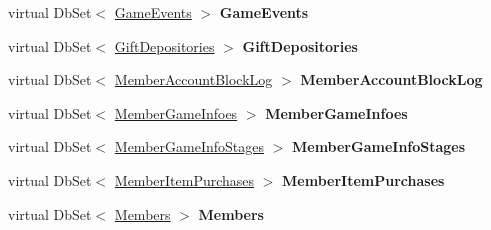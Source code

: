 \begin{DoxyCompactItemize}
\item 
virtual Db\+Set$<$ \hyperlink{a00083}{Game\+Events} $>$ {\bfseries Game\+Events}\hypertarget{a00065_a16fffa8f4637449b5e3f2db3afee1e06}{}\label{a00065_a16fffa8f4637449b5e3f2db3afee1e06}

\item 
virtual Db\+Set$<$ \hyperlink{a00086}{Gift\+Depositories} $>$ {\bfseries Gift\+Depositories}\hypertarget{a00065_aab20cb8f0bdfb846057cbcb1f18969f6}{}\label{a00065_aab20cb8f0bdfb846057cbcb1f18969f6}

\item 
virtual Db\+Set$<$ \hyperlink{a00135}{Member\+Account\+Block\+Log} $>$ {\bfseries Member\+Account\+Block\+Log}\hypertarget{a00065_ac4fe771e2a7b3c8b38b6f8995d996425}{}\label{a00065_ac4fe771e2a7b3c8b38b6f8995d996425}

\item 
virtual Db\+Set$<$ \hyperlink{a00137}{Member\+Game\+Infoes} $>$ {\bfseries Member\+Game\+Infoes}\hypertarget{a00065_a9d100a658fca7ffe660f1d8cc2f9b1fe}{}\label{a00065_a9d100a658fca7ffe660f1d8cc2f9b1fe}

\item 
virtual Db\+Set$<$ \hyperlink{a00139}{Member\+Game\+Info\+Stages} $>$ {\bfseries Member\+Game\+Info\+Stages}\hypertarget{a00065_a068e8c53f6de34b24adbe7b5fc7b8ee9}{}\label{a00065_a068e8c53f6de34b24adbe7b5fc7b8ee9}

\item 
virtual Db\+Set$<$ \hyperlink{a00141}{Member\+Item\+Purchases} $>$ {\bfseries Member\+Item\+Purchases}\hypertarget{a00065_aa7ca3897a4f4a4a687e0dc60ebfe2476}{}\label{a00065_aa7ca3897a4f4a4a687e0dc60ebfe2476}

\item 
virtual Db\+Set$<$ \hyperlink{a00145}{Members} $>$ {\bfseries Members}\hypertarget{a00065_a38c8f483ece9bae4844f446d481e8766}{}\label{a00065_a38c8f483ece9bae4844f446d481e8766}


\end{DoxyCompactItemize}
